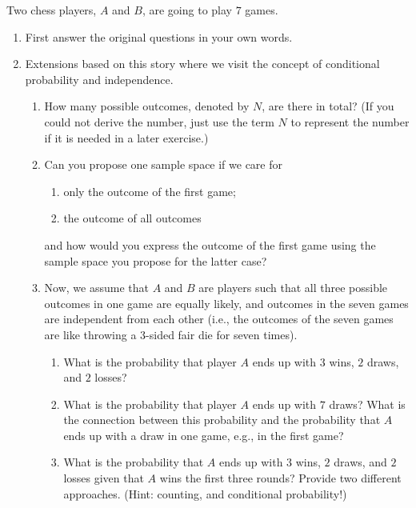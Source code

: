 
\setcounter{theorem}{6}
\begin{exercise}[BH.1.7]
	Two chess players, $A$ and $B$, are going to play $7$ games. 
		\begin{enumerate}
		\item First answer the original questions in your own words.
		\item Extensions based on this story where we visit the concept of conditional probability and independence.
		\begin{enumerate}
					\item How many possible outcomes, denoted by $N$, are there in total? (If you could not derive the number, just use the term $N$ to represent the number if it is needed in a later exercise.)
			\item Can you propose one sample space if we care for 
			\begin{enumerate}
				\item only the outcome of the first game;
				\item the outcome of all outcomes
			\end{enumerate}
			and how would you express the outcome of the first game using the sample space you propose for the latter case?
			\item Now, we assume that $A$ and $B$ are players such that all three possible outcomes in one game are equally likely, and outcomes in the seven games are independent from each other (i.e., the outcomes of the seven games are like throwing a $3$-sided fair die for seven times). 
			\begin{enumerate}
				\item What is the probability that player $A$ ends up with $3$ wins, $2$ draws, and $2$ losses?
				\item What is the probability that player $A$ ends up with $7$ draws? What is the connection between this probability and the probability that $A$ ends up with a draw in one game, e.g., in the first game?
				\item What is the probability that $A$ ends up with $3$ wins, $2$ draws, and $2$ losses given that $A$ wins the first three rounds? Provide two different approaches. (Hint: counting, and conditional probability!) 
			\end{enumerate}
		\end{enumerate}
		\end{enumerate}
\end{exercise}


